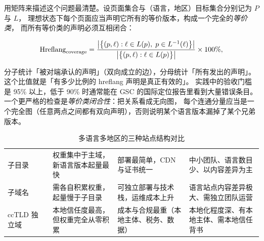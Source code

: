 用矩阵来描述这个问题最清楚。设页面集合与（语言，地区）目标集合分别记为 $P$ 与 $L$，
理想状态下每个页面应当声明它所有的等价版本，构成一个完全的\emph{等价类}，
而所有等价类的声明必须互相闭合：

\begin{equation}
\text{Hreflang}_{\text{coverage}} = \frac{\left\lvert \big\{ (p, \ell) : \ell \in L(p),\; p \in L^{-1}(\ell) \big\} \right\rvert}{\left\lvert \big\{ (p, \ell) : \ell \in L(p) \big\} \right\rvert} \times 100\% ,
\label{eq:hreflang}
\end{equation}

分子统计「被对端承认的声明」（双向成立的边），分母统计「所有发出的声明」。
这个比值就是「有多少比例的 hreflang 声明是真正有效的」。
实践中的验收门槛是 95\% 以上，低于 90\% 时通常能在 GSC 的国际定位报告里看到大量错误条目。
一个更严格的检查是\emph{等价类闭合性}：把关系看成无向图，
每个连通分量应当是一个完全图（任意两点之间都有双向声明），否则说明某个语言版本漏掉了某个兄弟版本。

\begin{table}[htbp]
\centering
\caption{多语言多地区的三种站点结构对比}
\label{tab:hreflangstruct}
\small
\begin{tabularx}{\textwidth}{L{1.9cm} L{2.5cm} L{2.6cm} L{2.4cm} Y}
\toprule
{} &  &  &  &  \\
\midrule
子目录 &  & 权重集中于主域，新语言版本起量最快 & 部署最简单，CDN 与证书统一 & 中小团队、语言数目少、以内容差异为主 \\
子域名 &  & 需各自积累权重，起量慢于子目录 & 可独立部署与技术栈，运维成本上升 & 语言站点内容差异极大、需独立团队运营 \\
ccTLD 独立域 &  & 本地信任度最高，但权重完全从零积累 & 成本与合规最重（本地主体、税务、数据） & 本地化程度深、有本地主体、需本地信任背书 \\
\bottomrule
\end{tabularx}
\end{table}

